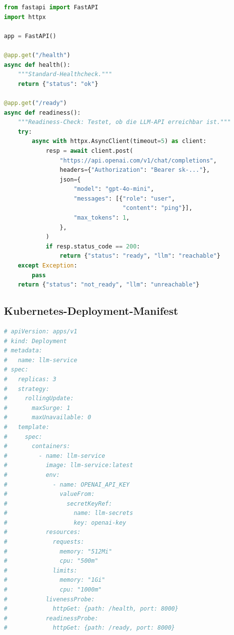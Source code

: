 \begin{lstlisting}[language=Python, caption={Health-Check mit API-Readiness}, label=lst:healthcheck]
from fastapi import FastAPI
import httpx

app = FastAPI()

@app.get("/health")
async def health():
    """Standard-Healthcheck."""
    return {"status": "ok"}

@app.get("/ready")
async def readiness():
    """Readiness-Check: Testet, ob die LLM-API erreichbar ist."""
    try:
        async with httpx.AsyncClient(timeout=5) as client:
            resp = await client.post(
                "https://api.openai.com/v1/chat/completions",
                headers={"Authorization": "Bearer sk-..."},
                json={
                    "model": "gpt-4o-mini",
                    "messages": [{"role": "user",
                                  "content": "ping"}],
                    "max_tokens": 1,
                },
            )
            if resp.status_code == 200:
                return {"status": "ready", "llm": "reachable"}
    except Exception:
        pass
    return {"status": "not_ready", "llm": "unreachable"}
\end{lstlisting}

\subsection{Kubernetes-Deployment-Manifest}

\begin{lstlisting}[language=Python, caption={Kubernetes-Deployment für LLM-Service (YAML)}]
# apiVersion: apps/v1
# kind: Deployment
# metadata:
#   name: llm-service
# spec:
#   replicas: 3
#   strategy:
#     rollingUpdate:
#       maxSurge: 1
#       maxUnavailable: 0
#   template:
#     spec:
#       containers:
#         - name: llm-service
#           image: llm-service:latest
#           env:
#             - name: OPENAI_API_KEY
#               valueFrom:
#                 secretKeyRef:
#                   name: llm-secrets
#                   key: openai-key
#           resources:
#             requests:
#               memory: "512Mi"
#               cpu: "500m"
#             limits:
#               memory: "1Gi"
#               cpu: "1000m"
#           livenessProbe:
#             httpGet: {path: /health, port: 8000}
#           readinessProbe:
#             httpGet: {path: /ready, port: 8000}
\end{lstlisting}


